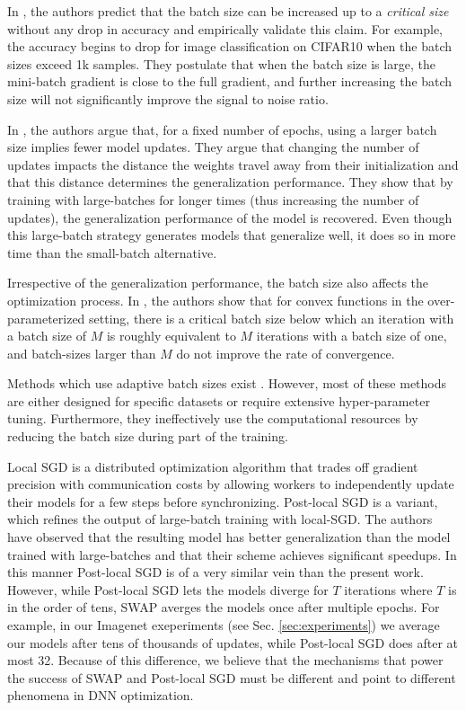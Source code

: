 \documentclass{article} %
\begin{document}
In \citep{openai}, the authors predict that the batch size can be increased up to
a \emph{critical size} without any drop in accuracy and empirically validate
this claim. For example, the accuracy begins to drop for image classification
on CIFAR10 when the batch sizes exceed 1k samples. They postulate that when the batch size is large, the mini-batch
gradient is close to the full gradient, and further increasing the batch size
will not significantly improve the signal to noise ratio. 

In \citep{hoffer17}, the authors argue that, for a fixed number of epochs, using a 
larger batch size implies fewer model updates. They argue that changing the number 
of updates impacts the distance the weights travel away from their initialization 
and that this distance determines the generalization performance. They show
that by training with large-batches for longer times (thus increasing the number of
updates), the generalization performance of the model is recovered. Even though this
large-batch strategy generates models that generalize well, it does so in more 
time than the small-batch alternative.

Irrespective of the generalization performance, the batch size also affects the
optimization process. In \citep{LBtheoryMa:2017}, the authors show that
for convex functions in the over-parameterized setting, there is a critical batch size below which an iteration
with a batch size of $M$ is roughly equivalent to $M$ iterations with a batch
size of one, and batch-sizes larger than $M$ do not improve the rate of convergence.

Methods which use adaptive batch sizes exist
\citep{adabatch,priya2017,imagenet4mins:2018,smith2017,you2017scalingImagenet32k}.
However, most of these methods are either designed for specific datasets or
require extensive hyper-parameter tuning. Furthermore, they ineffectively use
the computational resources by reducing the batch size during part of the
training.  

Local SGD
\citep{zhang_local_sgd,stich_local_sgd,li_federated_learning,yu_parallel_restarted_sgd}
is a distributed optimization algorithm that trades off gradient precision with
communication costs by allowing workers to independently update their models for a
few steps before synchronizing. Post-local SGD \citep{post_local_sgd} is a
variant, which refines the output of large-batch training with local-SGD. The
authors have observed that the resulting model has better generalization than
the model trained with large-batches and that their scheme achieves significant
speedups. In this manner Post-local SGD is of a very similar vein than the
present work. However, while Post-local SGD lets the models diverge for $T$
iterations where $T$ is in the order of tens, SWAP averges the models once
after multiple epochs. For example, in our Imagenet exeperiments (see Sec.
\ref{sec:experiments}) we average our models after tens of thousands of
updates, while Post-local SGD does after at most 32. Because of this
difference, we believe that the mechanisms that power the success of SWAP and
Post-local SGD must be different and point to different phenomena in DNN
optimization.
\end{document}
